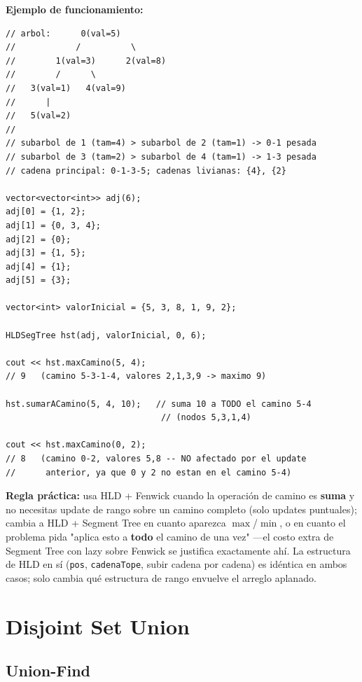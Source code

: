 \documentclass[10pt,a4paper,twocolumn]{article}
\begin{document}
\textbf{Ejemplo de funcionamiento:}

\begin{lstlisting}[style=cpp]
// arbol:      0(val=5)
//            /          \
//        1(val=3)      2(val=8)
//        /      \
//   3(val=1)   4(val=9)
//      |
//   5(val=2)
//
// subarbol de 1 (tam=4) > subarbol de 2 (tam=1) -> 0-1 pesada
// subarbol de 3 (tam=2) > subarbol de 4 (tam=1) -> 1-3 pesada
// cadena principal: 0-1-3-5; cadenas livianas: {4}, {2}

vector<vector<int>> adj(6);
adj[0] = {1, 2};
adj[1] = {0, 3, 4};
adj[2] = {0};
adj[3] = {1, 5};
adj[4] = {1};
adj[5] = {3};

vector<int> valorInicial = {5, 3, 8, 1, 9, 2};

HLDSegTree hst(adj, valorInicial, 0, 6);

cout << hst.maxCamino(5, 4);
// 9   (camino 5-3-1-4, valores 2,1,3,9 -> maximo 9)

hst.sumarACamino(5, 4, 10);   // suma 10 a TODO el camino 5-4
                               // (nodos 5,3,1,4)

cout << hst.maxCamino(0, 2);
// 8   (camino 0-2, valores 5,8 -- NO afectado por el update
//      anterior, ya que 0 y 2 no estan en el camino 5-4)
\end{lstlisting}

\textbf{Regla práctica:} usa HLD + Fenwick cuando la operación de
camino es \textbf{suma} y no necesitas update de rango sobre un
camino completo (solo updates puntuales); cambia a HLD + Segment Tree
en cuanto aparezca $\max$/$\min$, o en cuanto el problema pida
"aplica esto a \textbf{todo} el camino de una vez" —el costo extra de
Segment Tree con lazy sobre Fenwick se justifica exactamente ahí. La
estructura de HLD en sí (\texttt{pos}, \texttt{cadenaTope}, subir
cadena por cadena) es idéntica en ambos casos; solo cambia qué
estructura de rango envuelve el arreglo aplanado.




\section{Disjoint Set Union}

\subsection{Union-Find}
\end{document}
